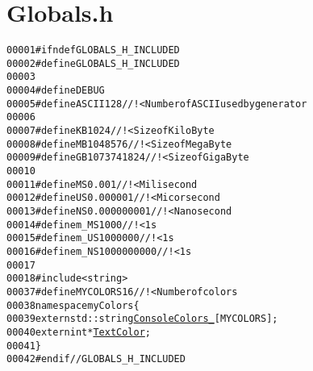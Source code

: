 \hypertarget{Globals_8h_source}{
\section{Globals.h}
}


\begin{footnotesize}\begin{alltt}
00001 \textcolor{preprocessor}{#ifndef GLOBALS\_H\_INCLUDED}
00002 \textcolor{preprocessor}{}\textcolor{preprocessor}{#define GLOBALS\_H\_INCLUDED}
00003 \textcolor{preprocessor}{}
00004 \textcolor{preprocessor}{    #define DEBUG}
00005 \textcolor{preprocessor}{}\textcolor{preprocessor}{    #define ASCII 128 //!< Number of ASCII used by generator}
00006 \textcolor{preprocessor}{}
00007 \textcolor{preprocessor}{    #define KB 1024 //!<Size of KiloByte}
00008 \textcolor{preprocessor}{}\textcolor{preprocessor}{    #define MB 1048576 //!<Size of MegaByte}
00009 \textcolor{preprocessor}{}\textcolor{preprocessor}{    #define GB 1073741824 //!<Size of GigaByte}
00010 \textcolor{preprocessor}{}
00011 \textcolor{preprocessor}{    #define MS 0.001 //!< Milisecond}
00012 \textcolor{preprocessor}{}\textcolor{preprocessor}{    #define US 0.000001 //!< Micorsecond}
00013 \textcolor{preprocessor}{}\textcolor{preprocessor}{    #define NS 0.000000001 //!< Nanosecond}
00014 \textcolor{preprocessor}{}\textcolor{preprocessor}{    #define m\_MS 1000 //!< 1s}
00015 \textcolor{preprocessor}{}\textcolor{preprocessor}{    #define m\_US 1000000 //!< 1s}
00016 \textcolor{preprocessor}{}\textcolor{preprocessor}{    #define m\_NS 1000000000 //!< 1s}
00017 \textcolor{preprocessor}{}
00018 \textcolor{preprocessor}{    #include <string>}
00037 \textcolor{preprocessor}{    #define MYCOLORS 16 //!< Number of colors}
00038 \textcolor{preprocessor}{}\textcolor{keyword}{namespace }myColors\{
00039     \textcolor{keyword}{extern} std::string \hyperlink{namespacemyColors_acd2740448dd52d14badb1864e14401ce}{ConsoleColors_}[MYCOLORS]; 
00040     \textcolor{keyword}{extern} \textcolor{keywordtype}{int} *\hyperlink{namespacemyColors_a52b646aad549675b463b1b37c6be6145}{TextColor}; 
00041 \}
00042 \textcolor{preprocessor}{#endif // GLOBALS\_H\_INCLUDED}
\end{alltt}\end{footnotesize}
